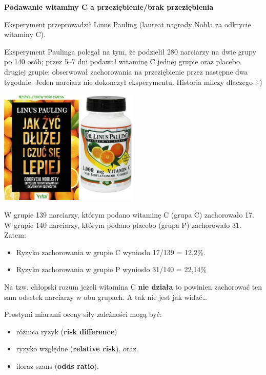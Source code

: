 \documentclass[
  openany]{book}
\providecommand{\tightlist}{%
  \setlength{\itemsep}{0pt}\setlength{\parskip}{0pt}}
\begin{document}
\begin{example}
\textbf{Podawanie witaminy C a przeziębienie/brak przeziębienia}

Eksperyment przeprowadził Linus Pauling (laureat nagrody Nobla
za odkrycie witaminy C).

Eksperyment Paulinga polegał na tym, że podzielił 280 narciarzy na dwie grupy
po 140 osób; przez 5--7 dni podawał witaminę C jednej grupie
oraz placebo drugiej grupie;
obserwował zachorowania na przeziębienie przez następne dwa tygodnie.
Jeden narciarz nie dokończył eksperymentu. Historia milczy dlaczego :-)

\includegraphics[width=0.5\textwidth,height=\textheight]{./Pauling.jpg}

W grupie 139 narciarzy, którym podano witaminę C
(grupa C) zachorowało 17. W grupie 140 narciarzy, którym podano placebo (grupa P)
zachorowało 31. Zatem:

\begin{itemize}
\tightlist
\item
  Ryzyko zachorowania w grupie C wyniosło 17/139 = 12,2\%.
\item
  Ryzyko zachorowania w grupie P wyniosło 31/140 = 22,14\%
\end{itemize}

Na tzw. chłopski rozum jeżeli witamina C \textbf{nie działa} to powinien
zachorować ten sam odsetek narciarzy w obu grupach.
A tak nie jest jak widać\ldots{}
\end{example}

Prostymi miarami oceny siły zależności mogą być:

\begin{itemize}
\tightlist
\item
  różnica ryzyk (\textbf{risk difference})
\item
  ryzyko względne (\textbf{relative risk}), oraz
\item
  iloraz szans (\textbf{odds ratio}).
\end{itemize}
\end{document}
